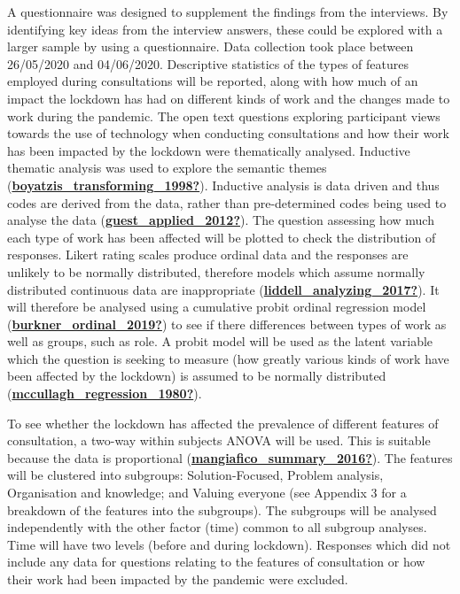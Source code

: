 \documentclass[
]{article}
\begin{document}
A questionnaire was designed to supplement the findings from the
interviews. By identifying key ideas from the interview answers, these
could be explored with a larger sample by using a questionnaire. Data
collection took place between 26/05/2020 and 04/06/2020. Descriptive
statistics of the types of features employed during consultations will
be reported, along with how much of an impact the lockdown has had on
different kinds of work and the changes made to work during the
pandemic. The open text questions exploring participant views towards
the use of technology when conducting consultations and how their work
has been impacted by the lockdown were thematically analysed. Inductive
thematic analysis was used to explore the semantic themes
(\protect\hyperlink{ref-boyatzis_transforming_1998}{\textbf{boyatzis\_transforming\_1998?}}).
Inductive analysis is data driven and thus codes are derived from the
data, rather than pre-determined codes being used to analyse the data
(\protect\hyperlink{ref-guest_applied_2012}{\textbf{guest\_applied\_2012?}}).
The question assessing how much each type of work has been affected will
be plotted to check the distribution of responses. Likert rating scales
produce ordinal data and the responses are unlikely to be normally
distributed, therefore models which assume normally distributed
continuous data are inappropriate
(\protect\hyperlink{ref-liddell_analyzing_2017}{\textbf{liddell\_analyzing\_2017?}}).
It will therefore be analysed using a cumulative probit ordinal
regression model
(\protect\hyperlink{ref-burkner_ordinal_2019}{\textbf{burkner\_ordinal\_2019?}})
to see if there differences between types of work as well as groups,
such as role. A probit model will be used as the latent variable which
the question is seeking to measure (how greatly various kinds of work
have been affected by the lockdown) is assumed to be normally
distributed
(\protect\hyperlink{ref-mccullagh_regression_1980}{\textbf{mccullagh\_regression\_1980?}}).

To see whether the lockdown has affected the prevalence of different
features of consultation, a two-way within subjects ANOVA will be used.
This is suitable because the data is proportional
(\protect\hyperlink{ref-mangiafico_summary_2016}{\textbf{mangiafico\_summary\_2016?}}).
The features will be clustered into subgroups: Solution-Focused, Problem
analysis, Organisation and knowledge; and Valuing everyone (see Appendix
3 for a breakdown of the features into the subgroups). The subgroups
will be analysed independently with the other factor (time) common to
all subgroup analyses. Time will have two levels (before and during
lockdown). Responses which did not include any data for questions
relating to the features of consultation or how their work had been
impacted by the pandemic were excluded.
\end{document}
